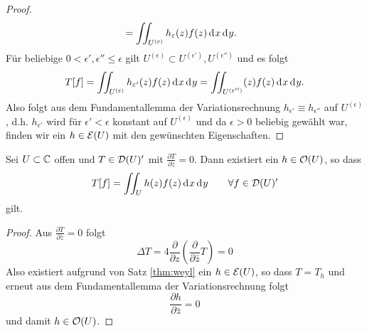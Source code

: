 \begin{proof}
\begin{align*}
    & = \iint_{U^{(\epsilon)}} h_\epsilon(z) f(z) \d[x]\d[y].
  \end{align*}
  Für beliebige $0 < \epsilon', \epsilon'' \leq \epsilon$ gilt
  $U^{(\epsilon)} \subset U^{(\epsilon')}, U^{(\epsilon'')}$ und es
  folgt
  \[
  T[f] = \iint_{U^{(\epsilon)}}h_{\epsilon'}(z) f(z) \d[x]\d[y] =
  \iint_{U^{(\epsilon'')}}(z) f(z) \d[x] \d[y].
  \]
  Also folgt aus dem Fundamentallemma der Variationsrechnung
  $h_{\epsilon'} \equiv h_{\epsilon''}$ auf $U^{(\epsilon)}$,
  d.h. $h_{\epsilon'}$ wird für $\epsilon' < \epsilon$ konstant auf
  $U^{(\epsilon)}$ und da $\epsilon > 0$ beliebig gewählt war, finden
  wir ein $h \in \mathcal{E}(U)$ mit den gewünschten Eigenschaften.
\end{proof}

\begin{cor}
  \label{cor:hol-dist}
  Sei $U \subset \mathbb{C}$ offen und $T \in \mathcal{D}(U)'$ mit $\frac{\partial
    T}{\partial \bar z} = 0$. 
  Dann existiert ein $h \in \mathcal{O}(U)$, so dass
  \[
  T[f] = \iint_U h(z)f(z) \d[x]\d[y] \qquad \forall f \in \dist(U)'
  \]
  gilt.
\end{cor}

\begin{proof}
  Aus $\frac{\partial T}{\partial \bar z} = 0$ folgt
  \[
  \Delta T  = 4 \frac{\partial}{\partial z} \left (
    \frac{\partial}{\partial \bar z} T \right ) = 0
  \]
  Also existiert aufgrund von Satz \ref{thm:weyl} ein $h \in
  \mathcal{E}(U)$, so dass $T = T_h$ und erneut aus dem Fundamentallemma der
  Variationsrechnung folgt
  \[
  \frac{\partial h}{\partial \bar z} = 0
  \]
  und damit $h \in \mathcal{O}(U)$.
\end{proof}



